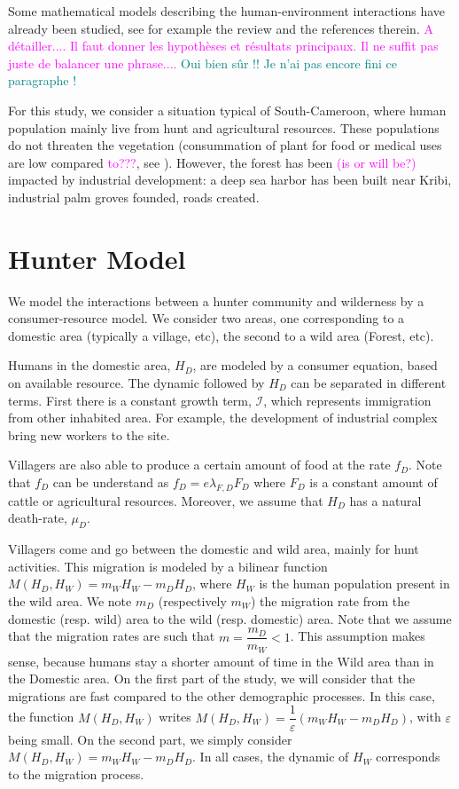 \documentclass{article}
\newcommand{\lfd}{\lambda_{F, D}}
\newcommand{\cI}{\mathcal{I}}
\newcommand{\marc}[1]{\textcolor{teal}{#1}}
\newcommand{\YD}[1]{\textcolor{magenta}{#1}}
\renewcommand{\epsilon}{\varepsilon}
\begin{document}
Some mathematical models describing the human-environment interactions have already been studied, see for example the review \cite{fanuel_modelling_2023} and the references therein. \YD{A détailler.... Il faut donner les hypothèses et résultats principaux. Il ne suffit pas juste de balancer une phrase....} \marc{Oui bien sûr !! Je n'ai pas encore fini ce paragraphe !}

For this study, we consider a situation typical of South-Cameroon, where human population mainly live from hunt and agricultural resources. These populations do not threaten the vegetation (consummation of plant for food or medical uses are low compared \YD{to???}, see \cite{koppert_consommation_1996}). However, the forest has been \YD{(is or will be?)} impacted by industrial development: a deep sea harbor has been built near Kribi, industrial palm groves founded, roads created.

\section{Hunter Model}

We model the interactions between a hunter community and wilderness by a consumer-resource model. We consider two areas, one corresponding to a domestic area (typically a village, etc), the second to a wild area (Forest, etc).

Humans in the domestic area, $H_D$, are modeled by a consumer equation, based on available resource. The dynamic followed by $H_D$ can be separated in different terms. 
First there is a constant growth term, $\cI$, which represents immigration from other inhabited area. For example, the development of industrial complex bring new workers to the site.

Villagers are also able to produce a certain amount of food at the rate $f_D$. Note that $f_D$ can be understand as $f_D = e \lfd F_D$ where $F_D$ is a constant amount of cattle or agricultural resources. 
Moreover, we assume that $H_D$ has a natural death-rate, $\mu_D$.

Villagers come and go 
between the domestic and wild area, mainly for hunt activities. This migration is modeled by a bilinear function $M(H_D, H_W) = m_W H_W - m_D H_D$, where $H_W$ is the human population present in the wild area. We note $m_D$ (respectively $m_W$) the migration rate from the domestic (resp. wild) area to the wild (resp. domestic) area. Note that we assume that the migration rates are such that $m = \dfrac{m_D}{m_W} < 1$. This assumption makes sense, because humans stay a shorter amount of time in the Wild area than in the Domestic area. On the first part of the study, we will consider that the migrations are fast compared to the other demographic processes. In this case, the function $M(H_D, H_W)$ writes $M(H_D, H_W) = \dfrac{1}{\epsilon} (m_W H_W - m_D H_D)$, with $\epsilon$ being small.
On the second part, we simply consider $M(H_D, H_W) = m_W H_W - m_D H_D$.
In all cases, the dynamic of $H_W$ corresponds to the migration process. 
\end{document}
